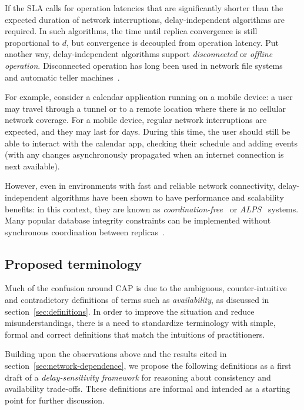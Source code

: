 \documentclass[a4paper,twocolumn,10pt]{article}
\begin{document}
If the SLA calls for operation latencies that are significantly shorter than the expected duration
of network interruptions, delay-independent algorithms are required. In such algorithms, the time
until replica convergence is still proportional to $d$, but convergence is decoupled from operation
latency. Put another way, delay-independent algorithms support \emph{disconnected} or \emph{offline
operation}. Disconnected operation has long been used in network file systems~\cite{Kistler1992bt}
and automatic teller machines~\cite{Brewer2012tr}.

For example, consider a calendar application running on a mobile device: a user may travel through a
tunnel or to a remote location where there is no cellular network coverage. For a mobile device,
regular network interruptions are expected, and they may last for days. During this time, the user
should still be able to interact with the calendar app, checking their schedule and adding events
(with any changes asynchronously propagated when an internet connection is next available).

However, even in environments with fast and reliable network connectivity, delay-independent
algorithms have been shown to have performance and scalability benefits: in this context, they are
known as \emph{coordination-free}~\cite{Bailis2014th} or \emph{ALPS}~\cite{Lloyd2011hz} systems.
Many popular database integrity constraints can be implemented without synchronous coordination
between replicas~\cite{Bailis2014th}.

\subsection{Proposed terminology}\label{sec:terminology}

Much of the confusion around CAP is due to the ambiguous, counter-intuitive and contradictory
definitions of terms such as \emph{availability}, as discussed in section~\ref{sec:definitions}. In
order to improve the situation and reduce misunderstandings, there is a need to standardize
terminology with simple, formal and correct definitions that match the intuitions of practitioners.

Building upon the observations above and the results cited in section~\ref{sec:network-dependence},
we propose the following definitions as a first draft of a \emph{delay-sensitivity framework} for
reasoning about consistency and availability trade-offs. These definitions are informal and intended
as a starting point for further discussion.
\end{document}
